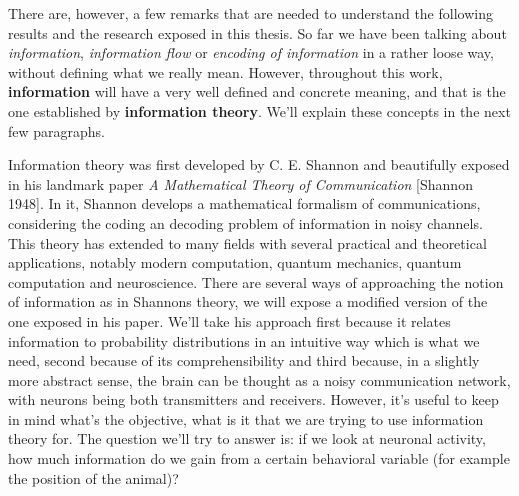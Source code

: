 There are, however, a few remarks that are needed to understand the following results and the research exposed in this thesis.
So far we have been talking about \textit{information}, \textit{information flow} or \textit{encoding of information} in a rather loose way, without defining what we really mean. 
However, throughout this work, \textbf{information} will have a very well defined and concrete meaning, and that is the one established by \textbf{information theory}.
We'll explain these concepts in the next few paragraphs.

Information theory was first developed by C. E. Shannon and beautifully exposed in his landmark paper \textit{A Mathematical Theory of Communication} [Shannon 1948].
In it, Shannon develops a mathematical formalism of communications, considering the coding an decoding problem of information in noisy channels.
This theory has extended to many fields with several practical and theoretical applications, notably modern computation, quantum mechanics, quantum computation and neuroscience.
There are several ways of approaching the notion of information as in Shannons theory, we will expose a modified version of the one exposed in his paper.
We'll take his approach first because it relates information to probability distributions in an intuitive way which is what we need, second because of its comprehensibility and third because, in a slightly more abstract sense, the brain can be thought as a noisy communication network, with neurons being both transmitters and receivers.
However, it's useful to keep in mind what's the objective, what is it that we are trying to use information theory for. 
The question we'll try to answer is: if we look at neuronal activity, how much information do we gain from a certain behavioral variable (for example the position of the animal)? 

